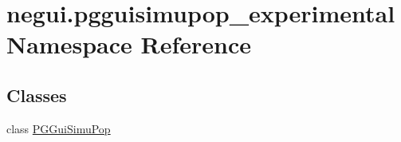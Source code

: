 \hypertarget{namespacenegui_1_1pgguisimupop__experimental}{}\section{negui.\+pgguisimupop\+\_\+experimental Namespace Reference}
\label{namespacenegui_1_1pgguisimupop__experimental}
\subsection*{Classes}
\begin{DoxyCompactItemize}
\item 
class \hyperlink{classnegui_1_1pgguisimupop__experimental_1_1PGGuiSimuPop}{P\+G\+Gui\+Simu\+Pop}
\end{DoxyCompactItemize}
